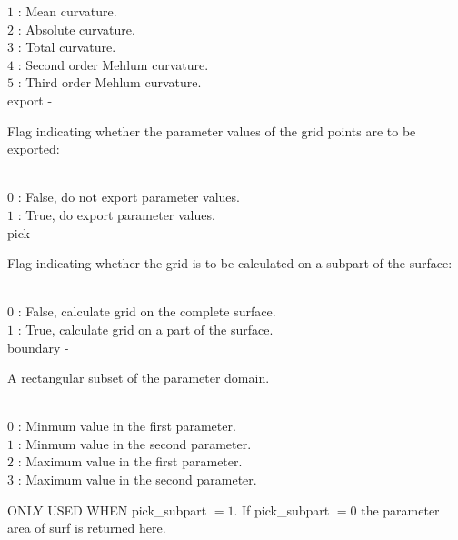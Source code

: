         \>\>\>\> $1$  \> : Mean curvature.\\
        \>\>\>\> $2$  \> : Absolute curvature.\\
        \>\>\>\> $3$  \> : Total curvature.\\
        \>\>\>\> $4$  \> : Second order Mehlum curvature.\\
        \>\>\>\> $5$  \> : Third order Mehlum curvature.\\
        \>\>    {\fov export}\> - \>  \begin{minipg2}
                     Flag indicating whether the parameter values
                            of the grid points are to be exported:
                               \end{minipg2}\\[0.8ex]
        \>\>\>\> $0$  \> : False, do not export parameter values.\\
        \>\>\>\> $1$  \> : True, do export parameter values.\\
        \>\>    {\fov pick}\> - \>  \begin{minipg2}
                     Flag indicating whether the grid is to be
                            calculated on a subpart of the surface:
                               \end{minipg2}\\[0.8ex]
        \>\>\>\> $0$  \> : False, calculate grid on the complete surface.\\
        \>\>\>\> $1$  \> : True, calculate grid on a part of the surface.\\
        \>\>    {\fov boundary}\> - \>  \begin{minipg2}
                     A rectangular subset of the parameter domain.
                               \end{minipg2}\\[0.8ex]
        \>\>\>\> $0$  \> : Minmum value in the first parameter.\\
        \>\>\>\> $1$  \> : Minmum value in the second parameter.\\
        \>\>\>\> $2$  \> : Maximum value in the first parameter.\\
        \>\>\>\> $3$  \> : Maximum value in the second parameter.\\
        \>\>\>\> \begin{minipg2}
                            ONLY USED WHEN {\fov pick\_subpart} $= 1$.
                            If {\fov pick\_subpart} $= 0$
                            the parameter area of surf is returned here.
                               \end{minipg2}\\[0.8ex]

